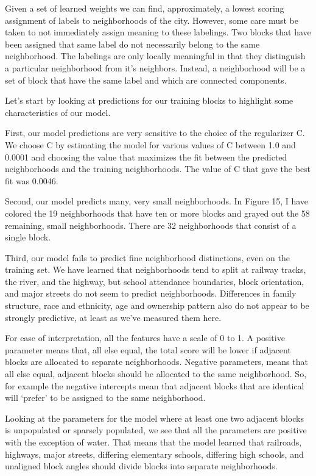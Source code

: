 \documentclass[12pt,letter]{article}\usepackage[]{graphicx}\usepackage[]{color}
\begin{document}
Given a set of learned weights we can find, approximately, a lowest
scoring assignment of labels to neighborhoods of the city. However,
some care must be taken to not immediately assign meaning to these
labelings. Two blocks that have been assigned that same label do not
necessarily belong to the same neighborhood. The labelings are only
locally meaningful in that they distinguish a particular neighborhood
from it’s neighbors. Instead, a neighborhood will be a set of block
that have the same label and which are connected components.  

Let’s start by looking at predictions for our training blocks to
highlight some characteristics of our model.


First, our model predictions are very sensitive to the choice of the regularizer
C. We choose C by estimating the model for various values of C between
1.0 and 0.0001 and choosing the value that maximizes the fit between the
predicted neighborhoods and the training neighborhoods. The value of C
that gave the best fit was 0.0046.

Second, our model predicts many, very small neighborhoods. In Figure 15,
I have colored the 19 neighborhoods that have ten or more blocks and grayed
out the 58 remaining, small neighborhoods. There are 32 neighborhoods that
consist of a single block.

Third, our model fails to predict fine neighborhood distinctions, even
on the training set. We have learned that neighborhoods tend to split at
railway tracks, the river, and the highway, but school attendance boundaries,
block orientation, and major streets do not seem to predict neighborhoods.
Differences in family structure, race and ethnicity, age and ownership pattern
also do not appear to be strongly predictive, at least as we’ve measured them
here.

For ease of interpretation, all the features have a scale of 0 to 1. A
positive parameter means that, all else equal, the total score will be
lower if adjacent blocks are allocated to separate
neighborhoods. Negative parameters, means that all else equal,
adjacent blocks should be allocated to the same neighborhood. So, for
example the negative intercepts mean that adjacent blocks that are
identical will ‘prefer’ to be assigned to the same neighborhood.

Looking at the parameters for the model where at least one two
adjacent blocks is unpopulated or sparsely populated, we see that all
the parameters are positive with the exception of water. That means
that the model learned that railroads, highways, major streets,
differing elementary schools, differing high schools, and unaligned
block angles should divide blocks into separate neighborhoods.  
\end{document}
